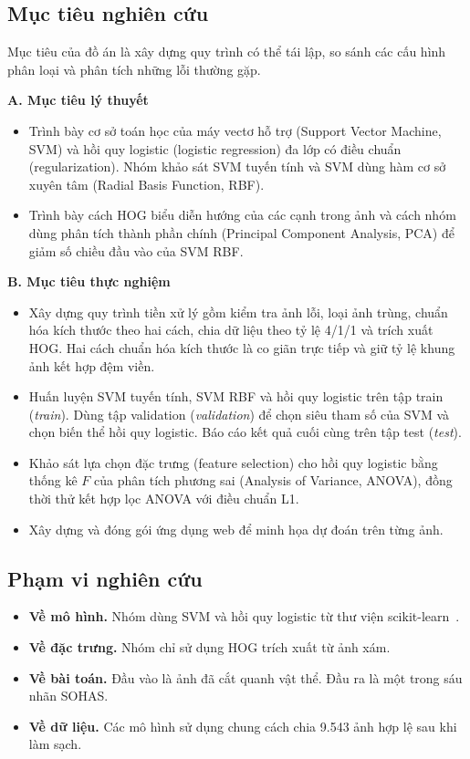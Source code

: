 \subsection{Mục tiêu nghiên cứu}

Mục tiêu của đồ án là xây dựng quy trình có thể tái lập, so sánh các cấu hình phân loại và phân tích những lỗi thường gặp.

\textbf{A. Mục tiêu lý thuyết}
\begin{itemize}
  \item Trình bày cơ sở toán học của máy vectơ hỗ trợ (Support Vector Machine, SVM) và hồi quy logistic (logistic regression) đa lớp có điều chuẩn (regularization). Nhóm khảo sát SVM tuyến tính và SVM dùng hàm cơ sở xuyên tâm (Radial Basis Function, RBF).
  \item Trình bày cách HOG biểu diễn hướng của các cạnh trong ảnh và cách nhóm dùng phân tích thành phần chính (Principal Component Analysis, PCA) để giảm số chiều đầu vào của SVM RBF.
\end{itemize}

\textbf{B. Mục tiêu thực nghiệm}
\begin{itemize}
  \item Xây dựng quy trình tiền xử lý gồm kiểm tra ảnh lỗi, loại ảnh trùng, chuẩn hóa kích thước theo hai cách, chia dữ liệu theo tỷ lệ 4/1/1 và trích xuất HOG. Hai cách chuẩn hóa kích thước là co giãn trực tiếp và giữ tỷ lệ khung ảnh kết hợp đệm viền.
  \item Huấn luyện SVM tuyến tính, SVM RBF và hồi quy logistic trên tập train (\emph{train}). Dùng tập validation (\emph{validation}) để chọn siêu tham số của SVM và chọn biến thể hồi quy logistic. Báo cáo kết quả cuối cùng trên tập test (\emph{test}).
  \item Khảo sát lựa chọn đặc trưng (feature selection) cho hồi quy logistic bằng thống kê $F$ của phân tích phương sai (Analysis of Variance, ANOVA), đồng thời thử kết hợp lọc ANOVA với điều chuẩn L1.
  \item Xây dựng và đóng gói ứng dụng web để minh họa dự đoán trên từng ảnh.
\end{itemize}

\subsection{Phạm vi nghiên cứu}

\begin{itemize}
  \item \textbf{Về mô hình.} Nhóm dùng SVM và hồi quy logistic từ thư viện scikit-learn~\cite{sklearn}.
  \item \textbf{Về đặc trưng.} Nhóm chỉ sử dụng HOG trích xuất từ ảnh xám.
  \item \textbf{Về bài toán.} Đầu vào là ảnh đã cắt quanh vật thể. Đầu ra là một trong sáu nhãn SOHAS.
  \item \textbf{Về dữ liệu.} Các mô hình sử dụng chung cách chia 9.543 ảnh hợp lệ sau khi làm sạch.
\end{itemize}

